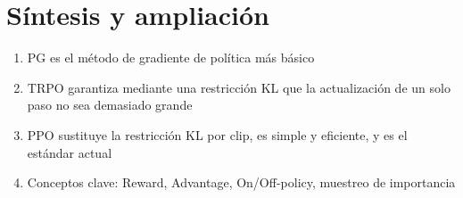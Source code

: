 \documentclass[a4paper]{article}
\begin{document}
\newpage
\section{Síntesis y ampliación}
\begin{enumerate}
  \item PG es el método de gradiente de política más básico
  \item TRPO garantiza mediante una restricción KL que la actualización de un solo paso no sea demasiado grande
  \item PPO sustituye la restricción KL por clip, es simple y eficiente, y es el estándar actual
  \item Conceptos clave: Reward, Advantage, On/Off-policy, muestreo de importancia
\end{enumerate}
\end{document}
